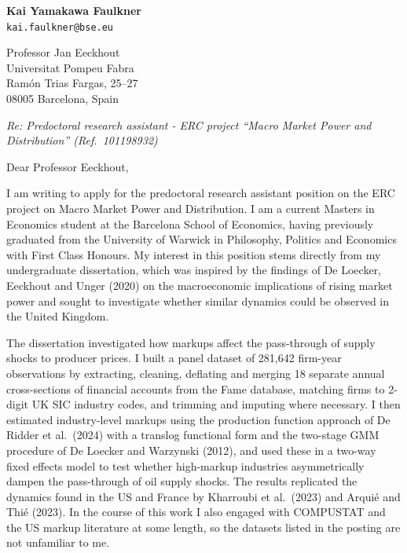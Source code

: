 \documentclass[11pt]{article}
\begin{document}
\thispagestyle{empty}

\begin{flushright}
\textbf{Kai Yamakawa Faulkner}\\
\texttt{kai.faulkner@bse.eu}
\end{flushright}

\vspace{0.6em}

\vspace{0.9em}
\noindent
Professor Jan Eeckhout\\
Universitat Pompeu Fabra\\
Ram\'on Trias Fargas, 25--27\\
08005 Barcelona, Spain

\vspace{0.55em}
\noindent\textit{Re: Predoctoral research assistant - ERC project ``Macro Market Power and Distribution'' (Ref.\ 101198932)}

\vspace{0.65em}
Dear Professor Eeckhout,

I am writing to apply for the predoctoral research assistant position on the ERC project on Macro Market Power and Distribution. I am a current Masters in Economics student at the Barcelona School of Economics, having previously graduated from the University of Warwick in Philosophy, Politics and Economics with First Class Honours. My interest in this position stems directly from my undergraduate dissertation, which was inspired by the findings of De Loecker, Eeckhout and Unger (2020) on the macroeconomic implications of rising market power and sought to investigate whether similar dynamics could be observed in the United Kingdom.

The dissertation investigated how markups affect the pass-through of supply shocks to producer prices. I built a panel dataset of 281,642 firm-year observations by extracting, cleaning, deflating and merging 18 separate annual cross-sections of financial accounts from the Fame database, matching firms to 2-digit UK SIC industry codes, and trimming and imputing where necessary. I then estimated industry-level markups using the production function approach of De Ridder et al.\ (2024) with a translog functional form and the two-stage GMM procedure of De Loecker and Warzynski (2012), and used these in a two-way fixed effects model to test whether high-markup industries asymmetrically dampen the pass-through of oil supply shocks. The results replicated the dynamics found in the US and France by Kharroubi et al.\ (2023) and Arqui\'e and Thi\'e (2023). In the course of this work I also engaged with COMPUSTAT and the US markup literature at some length, so the datasets listed in the posting are not unfamiliar to me.
\end{document}
